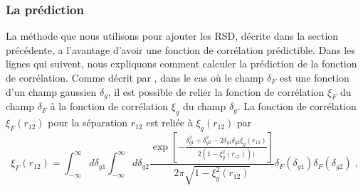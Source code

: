 \subsubsection{La prédiction}
\label{subsubsec:pred}

La méthode que nous utilisons pour ajouter les RSD, décrite dans la section précédente, a l'avantage d'avoir une fonction de corrélation prédictible. %
Dans les lignes qui suivent, nous expliquons comment calculer la prédiction de la fonction de corrélation. Comme décrit par \textcite{Font-Ribera2012}, dans le cas où le champ $\delta_F$ est une fonction d'un champ gaussien $\delta_g$, il est possible de relier la fonction de corrélation $\xi_F$ du champ $\delta_F$ à la fonction de corrélation $\xi_g$ du champ $\delta_g$. La fonction de corrélation $\xi_F(r_{12})$ pour la séparation $r_{12}$ est reliée à $\xi_g(r_{12})$ par
\begin{equation}
  \label{eq:xig2xif}
  \xi_F(r_{12}) = \int_{- \infty}^{\infty} d\delta_{g1} \int_{- \infty}^{\infty} d\delta_{g2}
  \frac{
    \exp\left[-
      \frac{
        \delta_{g1}^2 + \delta_{g2}^2 - 2 \delta_{g1} \delta_{g2} \xi_g(r_{12})
      }{
        2 ( 1 - \xi_g^2(r_{12})))
      }\right]
  }{
    2 \pi \sqrt{1 - \xi_g^2(r_{12})}
  }
  \delta_F(\delta_{g1})\delta_F(\delta_{g2})
  \; ,
\end{equation}
